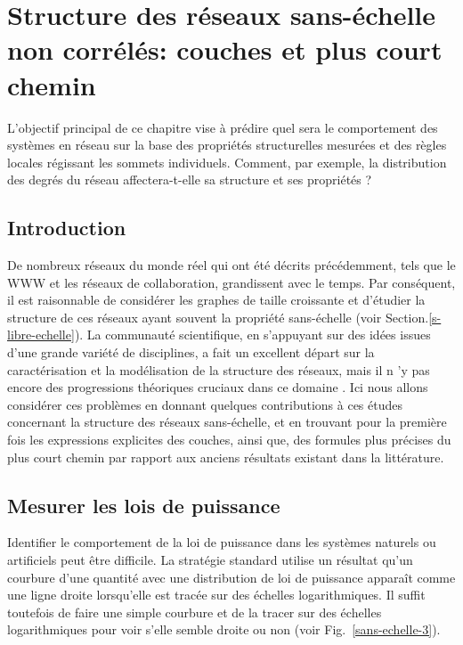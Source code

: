 \newcommand{\nl}{$n_{\ell}$ }
\newcommand{\km}{\textless k \textgreater}
\chapter{Structure des réseaux sans-échelle non corrélés: couches et plus court chemin}
\label{sec3}
L'objectif principal de ce chapitre vise à prédire quel sera le comportement des systèmes en réseau sur la base des propriétés structurelles mesurées et des règles locales régissant les sommets individuels. Comment, par exemple, la distribution des degrés du réseau affectera-t-elle sa  structure et ses propriétés ?

\section{Introduction}

De nombreux réseaux du monde réel qui ont été décrits précédemment, tels que le WWW et les réseaux de collaboration, grandissent avec le temps. Par conséquent, il est raisonnable de considérer les graphes de taille croissante et d'étudier la structure de ces réseaux ayant souvent la propriété sans-échelle (voir Section.\ref{s-libre-echelle}). 
La communauté scientifique, en s'appuyant sur des idées issues d'une grande variété de disciplines, a fait un excellent départ sur la caractérisation et la modélisation de la structure des réseaux, mais il n 'y pas encore des progressions théoriques cruciaux dans ce domaine \cite{Ne2003}. Ici nous allons considérer ces problèmes en donnant quelques contributions à ces études concernant la structure des réseaux sans-échelle, et en trouvant pour la première fois les expressions explicites des couches, ainsi que, des formules plus précises du plus court chemin par rapport aux anciens résultats existant dans la littérature. 
\section{Mesurer les lois de puissance}
Identifier le comportement de la loi de puissance dans les systèmes naturels ou artificiels peut être difficile. La stratégie standard utilise un résultat qu'un courbure d'une quantité avec une distribution de loi de puissance apparaît comme une ligne droite lorsqu'elle est tracée sur des échelles logarithmiques. Il suffit toutefois de faire une simple courbure et de la tracer sur des échelles logarithmiques pour voir s'elle semble droite ou non (voir Fig.~\ref{sans-echelle-3}).\\

